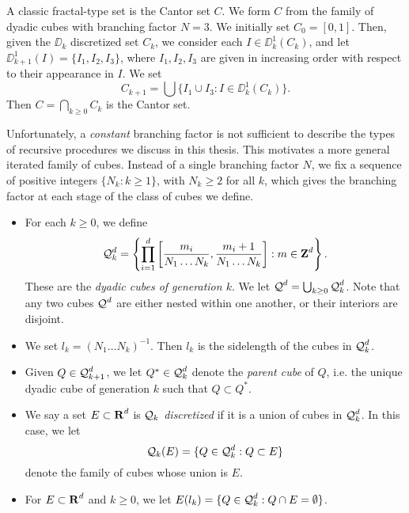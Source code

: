 \begin{example}
	A classic fractal-type set is the Cantor set $C$. We form $C$ from the family of dyadic cubes with branching factor $N = 3$. We initially set $C_0 = [0,1]$. Then, given the $\DD_k$ discretized set $C_k$, we consider each $I \in \DD_k^1(C_k)$, and let $\DD_{k+1}^1(I) = \{ I_1, I_2, I_3 \}$, where $I_1, I_2, I_3$ are given in increasing order with respect to their appearance in $I$. We set
	\[ C_{k+1} = \bigcup \{ I_1 \cup I_3 : I \in \DD_k^1(C_k) \}. \]
	Then $C = \bigcap_{k \geq 0} C_k$ is the Cantor set.
\end{example}

Unfortunately, a \emph{constant} branching factor is not sufficient to describe the types of recursive procedures we discuss in this thesis. This motivates a more general iterated family of cubes. Instead of a single branching factor $N$, we fix a sequence of positive integers $\{ N_k : k \geq 1 \}$, with $N_k \geq 2$ for all $k$, which gives the branching factor at each stage of the class of cubes we define.
%
\begin{itemize}
	\item For each $k \geq 0$, we define 
	\[ \operatorname{\mathcal{Q}}_k^d = \left\{ \prod_{i = 1}^d \left[ \frac{m_i}{N_1 \dots N_k}, \frac{m_i + 1}{N_1 \dots N_k} \right] : m \in \operatorname{\mathbf{Z}}^d \right\}. \]
	These are the \emph{dyadic cubes of generation $k$}. We let $\operatorname{\mathcal{Q}}^d = \bigcup_{k \geq 0} \operatorname{\mathcal{Q}}_k^d$. Note that any two cubes $\operatorname{\mathcal{Q}}^d$ are either nested within one another, or their interiors are disjoint.

	\item We set $l_k = (N_1 \dots N_k)^{-1}$. Then $l_k$ is the sidelength of the cubes in $\operatorname{\mathcal{Q}}_k^d$.

	\item Given $Q \in \operatorname{\mathcal{Q}}_{k+1}^d$, we let $Q^* \in \operatorname{\mathcal{Q}}_k^d$ denote the \emph{parent cube} of $Q$, i.e. the unique dyadic cube of generation $k$ such that $Q \subset Q^*$.

	\item We say a set $E \subset \operatorname{\mathbf{R}}^d$ is \emph{$\operatorname{\mathcal{Q}}_k$ discretized} if it is a union of cubes in $\operatorname{\mathcal{Q}}_k^d$. In this case, we let
	\[ \operatorname{\mathcal{Q}}_k(E) = \{ Q \in \operatorname{\mathcal{Q}}_k^d: Q \subset E \} \]
	denote the family of cubes whose union is $E$.

	\item For $E \subset \operatorname{\mathbf{R}}^d$ and $k \geq 0$, we let $E(l_k) = \{ Q \in \operatorname{\mathcal{Q}}_k^d : Q \cap E = \emptyset \}$.
\end{itemize}
%
